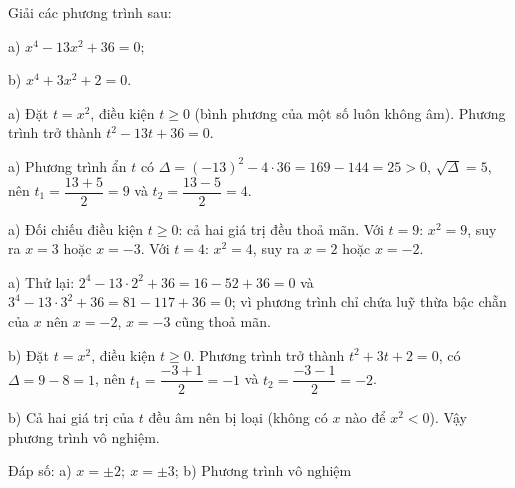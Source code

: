 \begin{problem}[9DS-PT2-039]
Giải các phương trình sau:

a) $x^4 - 13x^2 + 36 = 0$;

b) $x^4 + 3x^2 + 2 = 0$.

\begin{solution}
a) Đặt $t = x^2$, điều kiện $t \geq 0$ (bình phương của một số luôn không âm). Phương trình trở thành $t^2 - 13t + 36 = 0$.

a) Phương trình ẩn $t$ có $\Delta = (-13)^2 - 4 \cdot 36 = 169 - 144 = 25 > 0$, $\sqrt{\Delta} = 5$, nên $t_1 = \dfrac{13 + 5}{2} = 9$ và $t_2 = \dfrac{13 - 5}{2} = 4$.

a) Đối chiếu điều kiện $t \geq 0$: cả hai giá trị đều thoả mãn. Với $t = 9$: $x^2 = 9$, suy ra $x = 3$ hoặc $x = -3$. Với $t = 4$: $x^2 = 4$, suy ra $x = 2$ hoặc $x = -2$.

a) Thử lại: $2^4 - 13 \cdot 2^2 + 36 = 16 - 52 + 36 = 0$ và $3^4 - 13 \cdot 3^2 + 36 = 81 - 117 + 36 = 0$; vì phương trình chỉ chứa luỹ thừa bậc chẵn của $x$ nên $x = -2$, $x = -3$ cũng thoả mãn.

b) Đặt $t = x^2$, điều kiện $t \geq 0$. Phương trình trở thành $t^2 + 3t + 2 = 0$, có $\Delta = 9 - 8 = 1$, nên $t_1 = \dfrac{-3 + 1}{2} = -1$ và $t_2 = \dfrac{-3 - 1}{2} = -2$.

b) Cả hai giá trị của $t$ đều âm nên bị loại (không có $x$ nào để $x^2 < 0$). Vậy phương trình vô nghiệm.

Đáp số: a) $\boxed{x = \pm 2;\ x = \pm 3}$; b) $\boxed{\text{Phương trình vô nghiệm}}$
\end{solution}
\end{problem}

